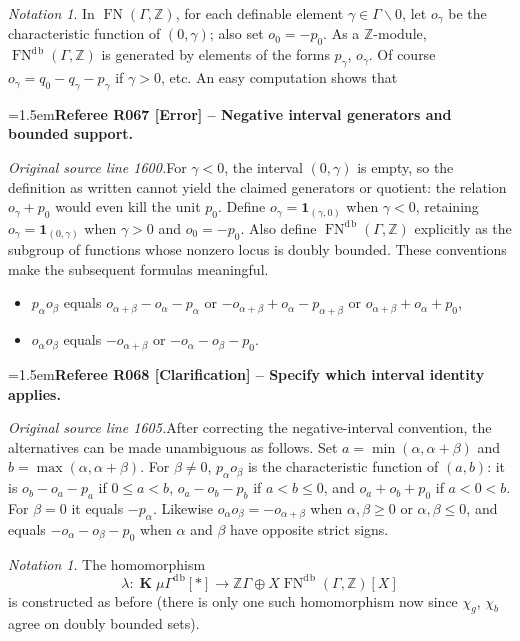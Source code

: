 \documentclass[12pt]{amsart}
\newcommand{\RefereeRemark}[4]{%
  \par\medskip\begingroup\normalfont\small\color{RefereePurple}%
  \emergencystretch=1.5em\noindent\textbf{Referee R#1 [#2] -- #3.}\par\nobreak\noindent #4\par
  \endgroup\medskip
}
\theoremstyle{plain}
\theoremstyle{definition}
\theoremstyle{remark}
\newtheorem{nota}[thm]{Notation}
\numberwithin{equation}{section}
\theoremstyle{plain}
\newcommand{\Z}{\mathds{Z}}
\newcommand{\0}{\emptyset}
\newcommand{\fun}{\longrightarrow}
\newcommand{\mi}{\smallsetminus}
\newcommand{\mG}{{\mu}{\Gamma}}
\DeclareMathOperator{\ggk}{\mathbf{K}}
\DeclareMathOperator{\fn}{FN}
\DeclareMathOperator{\db}{d \! b}
\begin{document}
\begin{nota}\label{db:generator}
In $\fn(\Gamma, \Z)$, for each definable element $\gamma \in \Gamma \mi 0$, let $o_{\gamma}$ be the characteristic function of $(0, \gamma)$; also set $o_0 = -p_0$. As a $\Z$-module, $\fn^{\db}(\Gamma, \Z)$ is generated by elements of the forms $p_\gamma$, $o_\gamma$. Of course $o_{\gamma} = q_0 - q_\gamma - p_\gamma$ if $\gamma> 0$, etc. An easy  computation shows that

\RefereeRemark{067}{Error}{Negative interval generators and bounded support}{%
\textit{Original source line 1600.}\quad For $\gamma<0$, the interval $(0,\gamma)$ is empty, so the definition as written cannot yield the claimed generators or quotient: the relation $o_\gamma+p_0$ would even kill the unit $p_0$. Define $o_\gamma=\mathbf1_{(\gamma,0)}$ when $\gamma<0$, retaining $o_\gamma=\mathbf1_{(0,\gamma)}$ when $\gamma>0$ and $o_0=-p_0$. Also define $\fn^{\db}(\Gamma,\mathbb Z)$ explicitly as the subgroup of functions whose nonzero locus is doubly bounded. These conventions make the subsequent formulas meaningful.
}
\begin{itemize}
  \item $p_\alpha o_\beta$ equals $o_{\alpha + \beta} - o_\alpha - p_\alpha$ or $- o_{\alpha + \beta} + o_\alpha - p_{\alpha + \beta}$ or $ o_{\alpha + \beta} + o_\alpha + p_{0}$,
  \item $o_\alpha o_\beta$ equals $- o_{\alpha + \beta}$ or $- o_{\alpha} - o_\beta - p_{0}$.
\end{itemize}
\end{nota}

\RefereeRemark{068}{Clarification}{Specify which interval identity applies}{%
\textit{Original source line 1605.}\quad After correcting the negative-interval convention, the alternatives can be made unambiguous as follows. Set $a=\min(\alpha,\alpha+\beta)$ and $b=\max(\alpha,\alpha+\beta)$. For $\beta\neq0$, $p_\alpha o_\beta$ is the characteristic function of $(a,b)$: it is $o_b-o_a-p_a$ if $0\leq a<b$, $o_a-o_b-p_b$ if $a<b\leq0$, and $o_a+o_b+p_0$ if $a<0<b$. For $\beta=0$ it equals $-p_\alpha$. Likewise $o_\alpha o_\beta=-o_{\alpha+\beta}$ when $\alpha,\beta\geq0$ or $\alpha,\beta\leq0$, and equals $-o_\alpha-o_\beta-p_0$ when $\alpha$ and $\beta$ have opposite strict signs.
}

\begin{nota}\label{db:gam:fn}
The homomorphism
\begin{equation*}
\lambda : \ggk \mG^{\db}[*] \fun \Z\Gamma \oplus X \fn^{\db}(\Gamma, \Z)[X]
\end{equation*}
is constructed as before (there is only one such homomorphism now since  $\chi_{g}$, $\chi_{b}$ agree on doubly bounded sets).
\end{nota}
\end{document}
